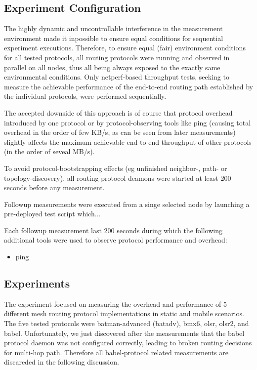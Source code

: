 \documentclass[a4paper,12pt,twoside]{article}
\begin{document}
\subsection{Experiment Configuration}
The highly dynamic and uncontrollable interference in the measurement
environment made it inpossible to ensure equal conditions for
sequential experiment executions. Therefore, to ensure equal (fair)
environment conditions for all tested protocols, all routing protocols
were running and observed in parallel on all nodes, thus all being
always exposed to the exactly same environmental conditions. Only
netperf-based throughput tests, seeking to measure the achievable
performance of the end-to-end routing path established by the
individual protocols, were performed sequentially.

The accepted downside of this approach is of course that protocol
overhead introduced by one protocol or by protocol-observing tools
like ping (causing total overhead in the order of few KB/s, as can be
seen from later measurements) slightly affects the maximum achievable
end-to-end throughput of other protocols (in the order of seveal
MB/s).

To avoid protocol-bootstrapping effects (eg unfinished neighbor-,
path- or topology-discovery), all routing protocol deamons were
started at least 200 seconds before any measurement.

Followup measurements were executed from a singe selected node by
launching a pre-deployed test script \cite{wbm-test} which...

Each followup measurement last 200 seconds during which the following
additional tools were used to observe protocol performance and
overhead: 
\begin{itemize}
\item ping
\end{itemize}

\subsection{Experiments}

The experiment focused on measuring the overhead and performance of 5
different mesh routing protocol implementations in static and mobile
scenarios. The five tested protocols were batman-advanced (batadv),
bmx6, olsr, olsr2, and babel. Unfortunately, we just discovered after
the measurements that the babel protocol daemon was not configured
correctly, leading to broken routing decisions for multi-hop
path. Therefore all babel-protocol related measurements are discareded
in the following discussion.
\end{document}
